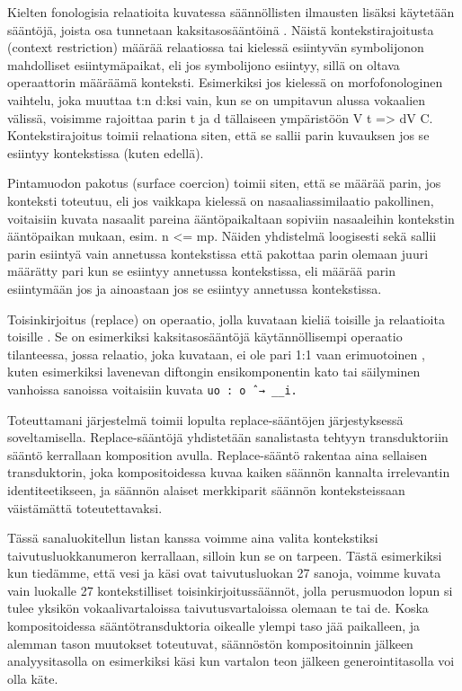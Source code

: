 \documentclass[free]{flammie}
\begin{document}
Kielten fonologisia relaatioita kuvatessa säännöllisten ilmausten lisäksi käytetään
sääntöjä, joista osa tunnetaan kaksitasosääntöinä \cite{koskenniemi1983twolevel}. Näistä
kontekstirajoitusta (context restriction) määrää relaatiossa tai kielessä esiintyvän
symbolijonon mahdolliset esiintymäpaikat, eli jos symbolijono esiintyy, sillä on
oltava operaattorin määräämä konteksti. Esimerkiksi jos kielessä on morfofonologinen vaihtelu, joka muuttaa t:n d:ksi vain, kun se on umpitavun alussa vokaalien
välissä, voisimme rajoittaa parin t ja d tällaiseen ympäristöön V t => dV C. Kontekstirajoitus toimii relaationa siten, että se sallii parin kuvauksen jos se esiintyy
kontekstissa (kuten edellä).

Pintamuodon pakotus (surface coercion) toimii siten, että se määrää parin, jos
konteksti toteutuu, eli jos vaikkapa kielessä on nasaaliassimilaatio pakollinen, voitaisiin kuvata nasaalit pareina ääntöpaikaltaan sopiviin nasaaleihin kontekstin ääntöpaikan mukaan, esim. n <= mp. Näiden yhdistelmä loogisesti sekä sallii parin
esiintyä vain annetussa kontekstissa että pakottaa parin olemaan juuri määrätty
pari kun se esiintyy annetussa kontekstissa, eli määrää parin esiintymään jos ja
ainoastaan jos se esiintyy annetussa kontekstissa.

Toisinkirjoitus (replace) on operaatio, jolla kuvataan kieliä toisille ja relaatioita
toisille \cite{karttunen1995replace}. Se on esimerkiksi kaksitasosääntöjä käytännöllisempi
operaatio tilanteessa, jossa relaatio, joka kuvataan, ei ole pari 1:1 vaan
erimuotoinen \cite{schmid2007b}, kuten esimerkiksi lavenevan diftongin ensikomponentin
kato tai säilyminen vanhoissa sanoissa voitaisiin kuvata \verb|uo : o ˆ→ __i.|

Toteuttamani järjestelmä toimii lopulta replace-sääntöjen järjestyksessä soveltamisella. Replace-sääntöjä yhdistetään sanalistasta tehtyyn transduktoriin sääntö
kerrallaan komposition avulla. Replace-sääntö rakentaa aina sellaisen transduktorin, joka kompositoidessa kuvaa kaiken säännön kannalta irrelevantin identiteetikseen, ja säännön alaiset merkkiparit säännön konteksteissaan väistämättä toteutettavaksi.

Tässä sanaluokitellun listan kanssa voimme aina valita kontekstiksi taivutusluokkanumeron kerrallaan, silloin kun se on tarpeen. Tästä esimerkiksi kun tiedämme, että vesi ja käsi ovat taivutusluokan 27 sanoja, voimme kuvata vain luokalle
27 kontekstilliset toisinkirjoitussäännöt, jolla perusmuodon lopun si tulee yksikön vokaalivartaloissa taivutusvartaloissa olemaan te tai de. Koska kompositoidessa sääntötransduktoria oikealle ylempi taso jää paikalleen, ja alemman tason
muutokset toteutuvat, säännöstön kompositoinnin jälkeen analyysitasolla on esimerkiksi käsi kun vartalon teon jälkeen generointitasolla voi olla käte.
\end{document}
